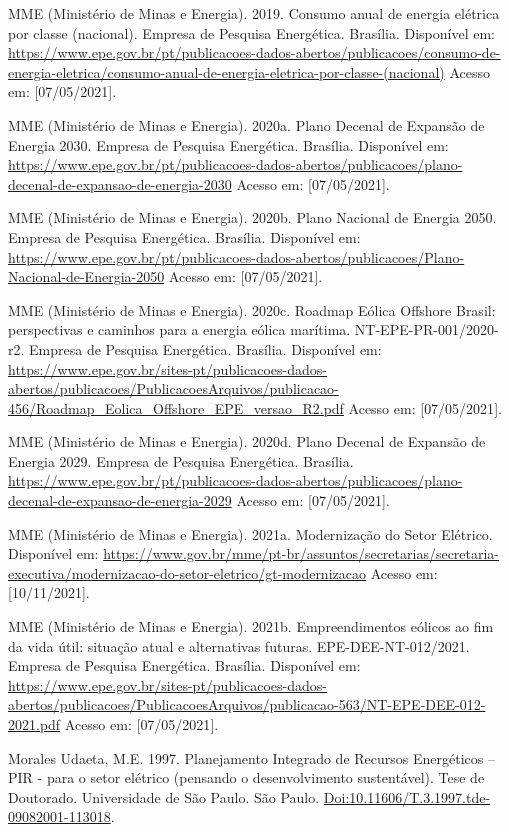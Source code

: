 \documentclass[
  oneside]{scrbook}
\begin{document}
MME (Ministério de Minas e Energia). 2019. Consumo anual de energia elétrica por classe (nacional). Empresa de Pesquisa Energética. Brasília. Disponível em: \url{https://www.epe.gov.br/pt/publicacoes-dados-abertos/publicacoes/consumo-de-energia-eletrica/consumo-anual-de-energia-eletrica-por-classe-(nacional)} Acesso em: {[}07/05/2021{]}.

MME (Ministério de Minas e Energia). 2020a. Plano Decenal de Expansão de Energia 2030. Empresa de Pesquisa Energética. Brasília. Disponível em: \url{https://www.epe.gov.br/pt/publicacoes-dados-abertos/publicacoes/plano-decenal-de-expansao-de-energia-2030} Acesso em: {[}07/05/2021{]}.

MME (Ministério de Minas e Energia). 2020b. Plano Nacional de Energia 2050. Empresa de Pesquisa Energética. Brasília. Disponível em: \url{https://www.epe.gov.br/pt/publicacoes-dados-abertos/publicacoes/Plano-Nacional-de-Energia-2050} Acesso em: {[}07/05/2021{]}.

MME (Ministério de Minas e Energia). 2020c. Roadmap Eólica Offshore Brasil: perspectivas e caminhos para a energia eólica marítima. NT-EPE-PR-001/2020-r2. Empresa de Pesquisa Energética. Brasília. Disponível em: \url{https://www.epe.gov.br/sites-pt/publicacoes-dados-abertos/publicacoes/PublicacoesArquivos/publicacao-456/Roadmap_Eolica_Offshore_EPE_versao_R2.pdf} Acesso em: {[}07/05/2021{]}.

MME (Ministério de Minas e Energia). 2020d. Plano Decenal de Expansão de Energia 2029. Empresa de Pesquisa Energética. Brasília. \url{https://www.epe.gov.br/pt/publicacoes-dados-abertos/publicacoes/plano-decenal-de-expansao-de-energia-2029} Acesso em: {[}07/05/2021{]}.

MME (Ministério de Minas e Energia). 2021a. Modernização do Setor Elétrico. Disponível em: \url{https://www.gov.br/mme/pt-br/assuntos/secretarias/secretaria-executiva/modernizacao-do-setor-eletrico/gt-modernizacao} Acesso em: {[}10/11/2021{]}.

MME (Ministério de Minas e Energia). 2021b. Empreendimentos eólicos ao fim da vida útil: situação atual e alternativas futuras. EPE-DEE-NT-012/2021. Empresa de Pesquisa Energética. Brasília. Disponível em: \url{https://www.epe.gov.br/sites-pt/publicacoes-dados-abertos/publicacoes/PublicacoesArquivos/publicacao-563/NT-EPE-DEE-012-2021.pdf} Acesso em: {[}07/05/2021{]}.

Morales Udaeta, M.E. 1997. Planejamento Integrado de Recursos Energéticos -- PIR - para o setor elétrico (pensando o desenvolvimento sustentável). Tese de Doutorado. Universidade de São Paulo. São Paulo. \url{Doi:10.11606/T.3.1997.tde-09082001-113018}.
\end{document}
